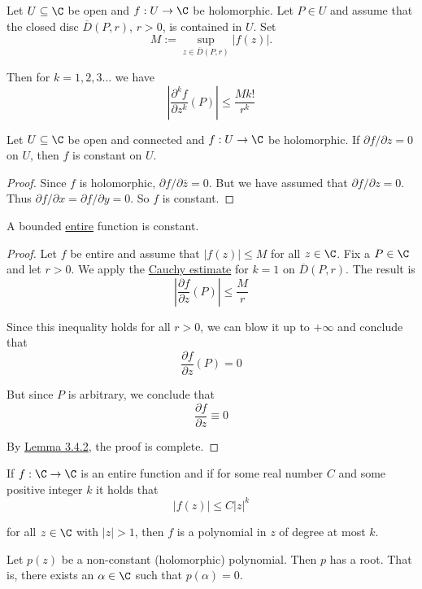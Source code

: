 Let $U\subseteq\C$ be open and $f:U\to\C$ be holomorphic. Let $P\in U$ and
assume that the closed disc $\overline D(P,r)$, $r>0$, is contained in $U$. Set
$$
  M:=\sup_{z\in\overline D(P,r)}|f(z)|.
$$

Then for $k=1,2,3\ldots$ we have
$$
  \left|\frac{\partial^kf}{\partial z^k}(P)\right|\leq\frac{Mk!}{r^k}
$$

\label{c2c7fd1}

Let $U\subseteq\C$ be open and connected and $f:U\to\C$ be holomorphic. If
$\partial f/\partial z=0$ on $U$, then $f$ is constant on $U$.

\begin{proof}
  Since $f$ is holomorphic, $\partial f/\partial\bar z=0$. But we have assumed
  that $\partial f/\partial z=0$. Thus $\partial f/\partial x=\partial f/\partial
  y=0$. So $f$ is constant.
\end{proof}

\label{cf6d8a9}

A bounded \href{d508dc8}{entire} function is constant.

\begin{proof}
  Let $f$ be entire and assume that $|f(z)|\leq M$ for all $z\in\C$. Fix a
  $P\in\C$ and let $r>0$. We apply the \href{a2d8611}{Cauchy estimate} for $k=1$
  on $\overline D(P,r)$. The result is
  $$
    \left|\frac{\partial f}{\partial z}(P)\right|\leq\frac Mr
  $$

  Since this inequality holds for all $r>0$, we can blow it up to $+\infty$ and
  conclude that
  $$
    \frac{\partial f}{\partial z}(P)=0
  $$

  But since $P$ is arbitrary, we conclude that
  $$
    \frac{\partial f}{\partial z}\equiv0
  $$

  By \href{c2c7fd1}{Lemma 3.4.2}, the proof is complete.
\end{proof}

\label{db4ce28}

If $f:\C\to\C$ is an entire function and if for some real number $C$ and some
positive integer $k$ it holds that
$$
  |f(z)|\leq C|z|^k
$$

for all $z\in\C$ with $|z|>1$, then $f$ is a polynomial in $z$ of degree at
most $k$.

\label{ae3b10d}

Let $p(z)$ be a non-constant (holomorphic) polynomial. Then $p$ has a root.
That is, there exists an $\alpha\in\C$ such that $p(\alpha)=0$.


